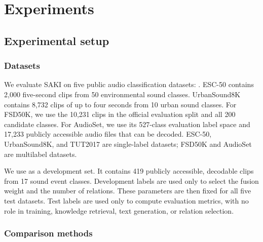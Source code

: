 \providecommand{\nextrevision}[1]{#1}
\section{Experiments}\label{sec:experiments}


\subsection{Experimental setup}\label{sec:setup}

\subsubsection{Datasets}\label{sec:datasets}

We evaluate SAKI on five public audio classification datasets: . ESC-50 contains 2,000 five-second clips from 50 environmental sound classes. UrbanSound8K contains 8,732 clips of up to four seconds from 10 urban sound classes.  For FSD50K, we use the 10,231 clips in the official evaluation split and all 200 candidate classes. For AudioSet, we use its 527-class evaluation label space and 17,233 publicly accessible audio files that can be decoded. ESC-50, UrbanSound8K, and TUT2017 are single-label datasets; FSD50K and AudioSet are multilabel datasets.

We use  as a development set. It contains 419 publicly accessible, decodable clips from 17 sound event classes. Development labels are used only to select the fusion weight and the number of relations. These parameters are then fixed for all five test datasets. Test labels are used only to compute evaluation metrics, with no role in training, knowledge retrieval, text generation, or relation selection.






\subsubsection{Comparison methods}\label{sec:comparison-methods}

